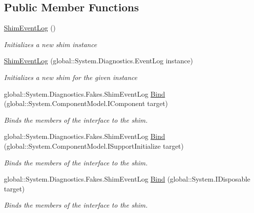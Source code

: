 \subsection*{Public Member Functions}
\begin{DoxyCompactItemize}
\item 
\hyperlink{class_system_1_1_diagnostics_1_1_fakes_1_1_shim_event_log_a8b46dbb8987b4f6a0335fbe14be4f11d}{Shim\-Event\-Log} ()
\begin{DoxyCompactList}\small\item\em Initializes a new shim instance\end{DoxyCompactList}\item 
\hyperlink{class_system_1_1_diagnostics_1_1_fakes_1_1_shim_event_log_a572027a3de0a6ed5cea2efe811d5ae81}{Shim\-Event\-Log} (global\-::\-System.\-Diagnostics.\-Event\-Log instance)
\begin{DoxyCompactList}\small\item\em Initializes a new shim for the given instance\end{DoxyCompactList}\item 
global\-::\-System.\-Diagnostics.\-Fakes.\-Shim\-Event\-Log \hyperlink{class_system_1_1_diagnostics_1_1_fakes_1_1_shim_event_log_add5bb4a75cb15b224fd5deacc20fc8c5}{Bind} (global\-::\-System.\-Component\-Model.\-I\-Component target)
\begin{DoxyCompactList}\small\item\em Binds the members of the interface to the shim.\end{DoxyCompactList}\item 
global\-::\-System.\-Diagnostics.\-Fakes.\-Shim\-Event\-Log \hyperlink{class_system_1_1_diagnostics_1_1_fakes_1_1_shim_event_log_a57d8599ffd833b3840ba85b3edc372d4}{Bind} (global\-::\-System.\-Component\-Model.\-I\-Support\-Initialize target)
\begin{DoxyCompactList}\small\item\em Binds the members of the interface to the shim.\end{DoxyCompactList}\item 
global\-::\-System.\-Diagnostics.\-Fakes.\-Shim\-Event\-Log \hyperlink{class_system_1_1_diagnostics_1_1_fakes_1_1_shim_event_log_a188c0b42cc20b6e3d6d182127f372f66}{Bind} (global\-::\-System.\-I\-Disposable target)
\begin{DoxyCompactList}\small\item\em Binds the members of the interface to the shim.\end{DoxyCompactList}\end{DoxyCompactItemize}
